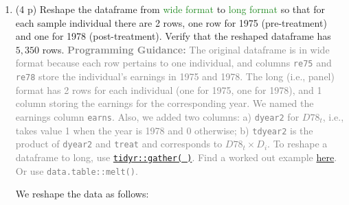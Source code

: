 \documentclass[
]{article}
\begin{document}
\begin{enumerate}
\def\labelenumi{\alph{enumi}.}
\item
  (4 p) Reshape the dataframe from \textcolor{ForestGreen}{wide format}
  to \textcolor{ForestGreen}{long format} so that for each sample
  individual there are 2 rows, one row for 1975 (pre-treatment) and one
  for 1978 (post-treatment). Verify that the reshaped dataframe has
  \(5,350\) rows.
  \textcolor{gray}{\textbf{Programming Guidance:} The original dataframe is in wide format because each row pertains to one individual, and columns \texttt{re75} and \texttt{re78} store the individual's earnings in 1975 and 1978. The long (i.e., panel) format has 2 rows for each individual (one for 1975, one for 1978), and 1 column storing the earnings for the corresponding year. We named the earnings column \texttt{earns}. Also, we added two columns: a) \texttt{dyear2} for $D78_{t}$, i.e., takes value 1 when the year is 1978 and 0 otherwise; b) \texttt{tdyear2} is the product of \texttt{dyear2} and \texttt{treat} and corresponds to $D78_t \times D_i$. To reshape a dataframe to long, use \href{https://tidyr.tidyverse.org/reference/gather.html}{\texttt{tidyr::gather( )}}. Find a worked out example \href{https://uc-r.github.io/tidyr}{here}. Or use \texttt{data.table::melt()}.}\label{item:BAfter-reshape}

  We reshape the data as follows:


\end{enumerate}
\end{document}
